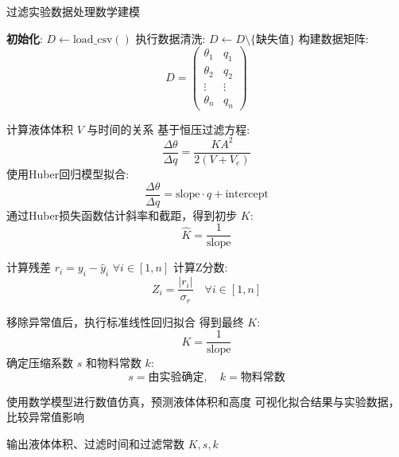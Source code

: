 \documentclass[UTF8,a4paper,multi=alg,varwidth]{standalone}
\begin{document}
\begin{minipage}{1.60\textwidth} %
\begin{algorithm}[H]
    \caption{过滤实验数据处理数学建模}
    
    \textbf{初始化}:  
    $D \leftarrow \text{load\_csv}()$\;
    执行数据清洗: $D \leftarrow D \setminus \{\text{缺失值}\}$\;
    构建数据矩阵:
    \[
    D = \begin{pmatrix}
    \theta_1 & q_1 \\
    \theta_2 & q_2 \\
    \vdots & \vdots \\
    \theta_n & q_n
    \end{pmatrix}
    \]
    
    计算液体体积 $V$ 与时间的关系\;
    基于恒压过滤方程:
    \[
    \frac{\Delta \theta}{\Delta q} = \frac{K A^2}{2(V + V_e)}
    \]
    使用Huber回归模型拟合:
    \[
    \frac{\Delta \theta}{\Delta q} = \text{slope} \cdot q + \text{intercept}
    \]
    通过Huber损失函数估计斜率和截距，得到初步 $K$:
    \[
    \hat{K} = \frac{1}{\text{slope}}
    \]
    
    计算残差 $r_i = y_i - \hat{y}_i$ \quad $\forall i \in [1,n]$\;
    计算Z分数:
    \[
    Z_i = \frac{|r_i|}{\sigma_r} \quad \forall i \in [1,n]
    \]
    
    移除异常值后，执行标准线性回归拟合\;
    得到最终 $K$:
    \[
    K = \frac{1}{\text{slope}}
    \]
    确定压缩系数 $s$ 和物料常数 $k$:
    \[
    s = \text{由实验确定}, \quad k = \text{物料常数}
    \]
    
    使用数学模型进行数值仿真，预测液体体积和高度\;
    可视化拟合结果与实验数据，比较异常值影响\;
    
    输出液体体积、过滤时间和过滤常数\;
    \Return $K, s, k$\;
\end{algorithm}
\end{minipage}
\end{document}
